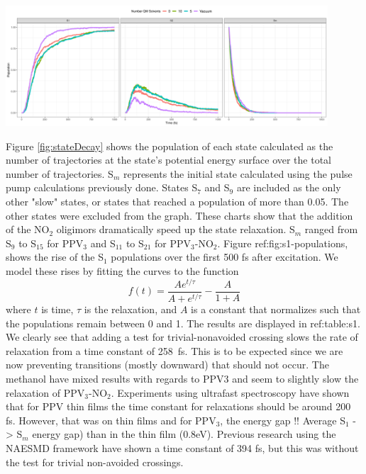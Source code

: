 \noindent
\begin{minipage}[c]{\textwidth}
  \centering
  \includegraphics[width=0.9\textwidth]{../Paper2/Images/populations/solvent_comparison.png}
  \label{fig:stateDecay}
\end{minipage}\bigskip

Figure \ref{fig:stateDecay} shows the population of each state calculated as
the number of trajectories at the state's potential energy surface over the
total number of trajectories. S\(_m\) represents the initial state calculated using
the pulse pump calculations previously done. States S\(_7\) and S\(_9\) are included as
the only other "slow" states, or states that reached a population of more than
0.05. The other states were excluded from the graph. These charts show that the
addition of the NO\(_2\) oligimors dramatically speed up the state relaxation. S\(_m\)
ranged from S\(_9\) to S\(_15\) for PPV\(_3\) and S\(_11\) to S\(_21\) for PPV\(_{3}\)-NO\(_{2}\). Figure
ref:fig:s1-populations, shows the rise of the S\(_{1}\) populations over the first
500 fs after excitation. We model these rises by fitting the curves to the
function
\begin{equation}
f(t) = \frac{Ae^{t/\tau}}{A+e^{t/\tau}} - \frac{A}{1+A}
\end{equation}
where $t$ is time, $\tau$ is the relaxation, and $A$ is a constant that
normalizes such that the populations remain between 0 and 1. The results are displayed in ref:table:s1. 
We clearly see that adding a test for trivial-nonavoided crossing slows the rate
of relaxation from a time constant of 258~fs. This is to be expected since we
are now preventing transitions (mostly downward) that should not occur. The
methanol have mixed results with regards to PPV3 and seem to slightly slow the
relaxation of PPV\(_3\)-NO\(_2\). Experiments using ultrafast spectroscopy have shown that
for PPV thin films the time constant for relaxations should be around 200 fs.
However, that was on thin films and for PPV\(_3\), the energy gap !! Average S\(_1\) ->
S\(_m\) energy gap) than in the thin film (0.8eV). Previous research using the
NAESMD framework have shown a time constant of 394 fs, but this was without the
test for trivial non-avoided crossings.

